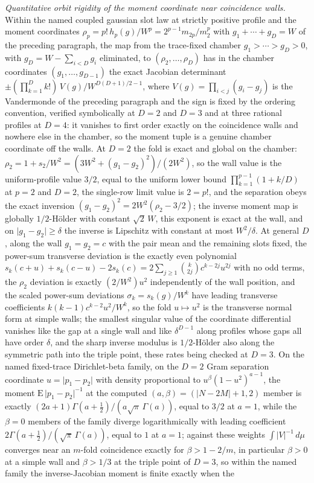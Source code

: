 \emph{Quantitative orbit rigidity of the moment coordinate near coincidence walls.} Within the named coupled gaussian slot law at strictly positive profile and the moment coordinates \(\rho_{p}=p!\,h_{p}(g)/W^{p}=2^{p-1}m_{2p}/m_{2}^{p}\) with \(g_{1}+\cdots+g_{D}=W\) of the preceding paragraph, the map from the trace-fixed chamber \(g_{1}>\cdots>g_{D}>0\), with \(g_{D}=W-\sum_{i<D}g_{i}\) eliminated, to \((\rho_{2},\ldots,\rho_{D})\) has in the chamber coordinates \((g_{1},\ldots,g_{D-1})\) the exact Jacobian determinant \(\pm(\prod_{k=1}^{D}k!)\,V(g)/W^{D(D+1)/2-1}\), where \(V(g)=\prod_{i<j}(g_{i}-g_{j})\) is the Vandermonde of the preceding paragraph and the sign is fixed by the ordering convention, verified symbolically at \(D=2\) and \(D=3\) and at three rational profiles at \(D=4\): it vanishes to first order exactly on the coincidence walls and nowhere else in the chamber, so the moment tuple is a genuine chamber coordinate off the walls. At \(D=2\) the fold is exact and global on the chamber: \(\rho_{2}=1+s_{2}/W^{2}=(3W^{2}+(g_{1}-g_{2})^{2})/(2W^{2})\), so the wall value is the uniform-profile value \(3/2\), equal to the uniform lower bound \(\prod_{k=1}^{p-1}(1+k/D)\) at \(p=2\) and \(D=2\), the single-row limit value is \(2=p!\), and the separation obeys the exact inversion \((g_{1}-g_{2})^{2}=2W^{2}(\rho_{2}-3/2)\); the inverse moment map is globally \(1/2\)-H\"older with constant \(\sqrt{2}\,W\), this exponent is exact at the wall, and on \(\lvert g_{1}-g_{2}\rvert\ge\delta\) the inverse is Lipschitz with constant at most \(W^{2}/\delta\). At general \(D\), along the wall \(g_{1}=g_{2}=c\) with the pair mean and the remaining slots fixed, the power-sum transverse deviation is the exactly even polynomial \(s_{k}(c+u)+s_{k}(c-u)-2s_{k}(c)=2\sum_{j\ge1}\binom{k}{2j}c^{k-2j}u^{2j}\) with no odd terms, the \(\rho_{2}\) deviation is exactly \((2/W^{2})u^{2}\) independently of the wall position, and the scaled power-sum deviations \(\sigma_{k}=s_{k}(g)/W^{k}\) have leading transverse coefficients \(k(k-1)c^{k-2}u^{2}/W^{k}\), so the fold \(u\mapsto u^{2}\) is the transverse normal form at simple walls; the smallest singular value of the coordinate differential vanishes like the gap at a single wall and like \(\delta^{D-1}\) along profiles whose gaps all have order \(\delta\), and the sharp inverse modulus is \(1/2\)-H\"older also along the symmetric path into the triple point, these rates being checked at \(D=3\). On the named fixed-trace Dirichlet-beta family, on the \(D=2\) Gram separation coordinate \(u=\lvert p_{1}-p_{2}\rvert\) with density proportional to \(u^{\beta}(1-u^{2})^{a-1}\), the moment \(\mathrm{E}\,\lvert p_{1}-p_{2}\rvert^{-1}\) at the computed \((a,\beta)=(\lvert N-2M\rvert+1,2)\) member is exactly \((2a+1)\Gamma(a+\tfrac12)/(a\sqrt{\pi}\,\Gamma(a))\), equal to \(3/2\) at \(a=1\), while the \(\beta=0\) members of the family diverge logarithmically with leading coefficient \(2\Gamma(a+\tfrac12)/(\sqrt{\pi}\,\Gamma(a))\), equal to \(1\) at \(a=1\); against these weights \(\int\lvert V\rvert^{-1}\,d\mu\) converges near an \(m\)-fold coincidence exactly for \(\beta>1-2/m\), in particular \(\beta>0\) at a simple wall and \(\beta>1/3\) at the triple point of \(D=3\), so within the named family the inverse-Jacobian moment is finite exactly when the 